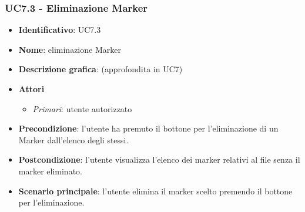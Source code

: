 \subsubsection{UC7.3 - Eliminazione Marker}
\begin{itemize}
  \item \textbf{Identificativo}: UC7.3
  \item \textbf{Nome}: eliminazione Marker
  \item \textbf{Descrizione grafica}: (approfondita in UC7)
  \item \textbf{Attori}
        \begin{itemize}
          \item \textit{Primari}: utente autorizzato
        \end{itemize}
  \item \textbf{Precondizione}: l'utente ha premuto il bottone per l'eliminazione di un Marker dall'elenco degli stessi.
  \item \textbf{Postcondizione}: l'utente visualizza l'elenco dei marker relativi al file senza il marker eliminato.
  \item \textbf{Scenario principale}: l'utente elimina il marker scelto premendo il bottone per l'eliminazione.
\end{itemize}
\newpage